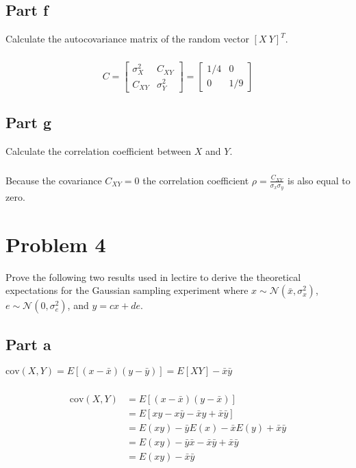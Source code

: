 \documentclass[11pt]{article}
\begin{document}
\subsection*{Part f}
Calculate the autocovariance matrix of the random vector $[X\ Y]^T$.

\subparagraph*{}
\begin{equation*}
	C = \begin{bmatrix} \sigma_X^2 & C_{XY} \\ C_{XY} & \sigma_Y^2 \end{bmatrix} = \begin{bmatrix} 1/4 & 0 \\ 0 & 1/9 \end{bmatrix}
\end{equation*}

\subsection*{Part g}
Calculate the correlation coefficient between $X$ and $Y$.

\subparagraph*{}
Because the covariance $C_{XY}=0$ the correlation coefficient $\rho=\frac{C_{XY}}{\sigma_x\sigma_y}$ is also equal to zero.

\section*{Problem 4}
Prove the following two results used in lectire to derive the theoretical expectations for the Gaussian sampling experiment where $x\sim \mathcal{N}(\bar{x},\sigma_x^2)$, $e\sim \mathcal{N}(0,\sigma_e^2)$, and $y=cx+de$.

\subsection*{Part a}
$\text{cov}(X,Y) = E[(x-\bar{x})(y-\bar{y})]=E[XY]-\bar{x}\bar{y}$

\subparagraph*{}
\begin{align*}
	\text{cov}(X,Y) &= E[(x-\bar{x})(y-\bar{x})] \\
	&= E[xy - x\bar{y} - \bar{x}y + \bar{x}\bar{y}] \\
	&= E(xy) - \bar{y}E(x) - \bar{x}E(y) +\bar{x}\bar{y} \\
	&= E(xy) - \bar{y}\bar{x} - \bar{x}\bar{y} + \bar{x}\bar{y} \\
	&= E(xy) - \bar{x}\bar{y}
\end{align*}
\end{document}
